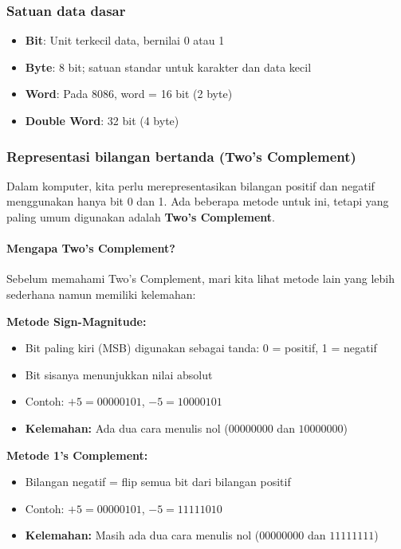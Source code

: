\documentclass[../main.tex]{subfiles}
\begin{document}
\subsubsection{Satuan data dasar}
\begin{itemize}
    \item \textbf{Bit}: Unit terkecil data, bernilai 0 atau 1
    \item \textbf{Byte}: 8 bit; satuan standar untuk karakter dan data kecil
    \item \textbf{Word}: Pada 8086, word = 16 bit (2 byte)
    \item \textbf{Double Word}: 32 bit (4 byte)
\end{itemize}

\subsubsection{Representasi bilangan bertanda (Two's Complement)}

Dalam komputer, kita perlu merepresentasikan bilangan positif dan negatif menggunakan hanya bit 0 dan 1. Ada beberapa metode untuk ini, tetapi yang paling umum digunakan adalah \textbf{Two's Complement}.

\paragraph{Mengapa Two's Complement?}
Sebelum memahami Two's Complement, mari kita lihat metode lain yang lebih sederhana namun memiliki kelemahan:

\textbf{Metode Sign-Magnitude:}
\begin{itemize}
    \item Bit paling kiri (MSB) digunakan sebagai tanda: 0 = positif, 1 = negatif
    \item Bit sisanya menunjukkan nilai absolut
    \item Contoh: \(+5 = 00000101\), \(-5 = 10000101\)
    \item \textbf{Kelemahan:} Ada dua cara menulis nol (\(00000000\) dan \(10000000\))
\end{itemize}

\textbf{Metode 1's Complement:}
\begin{itemize}
    \item Bilangan negatif = flip semua bit dari bilangan positif
    \item Contoh: \(+5 = 00000101\), \(-5 = 11111010\)
    \item \textbf{Kelemahan:} Masih ada dua cara menulis nol (\(00000000\) dan \(11111111\))
\end{itemize}
\end{document}
